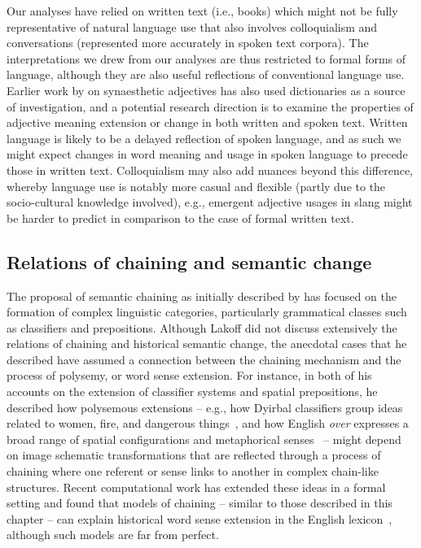 \documentclass[output=paper]{langsci/langscibook}
\begin{document}
Our analyses have relied on written text (i.e., books) which might not be fully representative of natural language use that also involves colloquialism and conversations (represented more accurately in spoken text corpora). The interpretations we drew from our analyses are thus restricted to formal forms of language, although they are also useful reflections of conventional language use. Earlier work by \citet{williams1976} on synaesthetic adjectives has also used dictionaries as a source of investigation, and a potential research direction is to examine the properties of adjective meaning extension or change in both written and spoken text. Written language is likely to be a delayed reflection of spoken language, and as such we might expect changes in word meaning and usage in spoken language to precede those in written text. Colloquialism may also add nuances beyond this difference, whereby language use is notably more casual and flexible (partly due to the socio-cultural knowledge involved), e.g., emergent adjective usages in slang might be harder to predict in comparison to the case of formal written text.

\subsection{Relations of chaining and semantic change}

The proposal of semantic chaining as initially described by \citet{lakoff1987} has focused on the formation of complex linguistic categories, particularly grammatical classes such as classifiers and prepositions. Although Lakoff did not discuss extensively the relations of chaining and historical semantic change, the anecdotal cases that he described have assumed a connection between the chaining mechanism and the process of polysemy, or word sense extension. For instance, in both of his accounts on the extension of classifier systems and spatial prepositions, he described how polysemous extensions -- e.g., how Dyirbal classifiers group ideas related to women, fire, and dangerous things~\citep{lakoff1987}, and how English \textit{over} expresses a broad range of spatial configurations and metaphorical senses~\citep{lakoff1987,brugman88} -- might depend on image schematic transformations that are reflected through a process of chaining where one referent or sense links to another in complex chain-like structures. Recent computational work has extended these ideas in a formal setting and found that models of chaining -- similar to those described in this chapter -- can explain historical word sense extension in the English lexicon~\citep{ramiro2018}, although such models are far from perfect.
\end{document}
